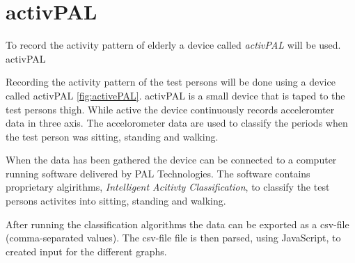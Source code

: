 \section{activPAL}
To record the activity pattern of elderly a device called \emph{activPAL} will be used. activPAL 


Recording the activity pattern of the test persons will be done using a device called activPAL \ref{fig:activePAL}. activPAL is a small device that is taped to the test persons thigh. While active the device continuously records acceleromter data in three axis. The accelorometer data are used to classify the periods when the test person was sitting, standing and walking.

When the data has been gathered the device can be connected to a computer running software delivered by PAL Technologies. The software contains proprietary algirithms, \emph{Intelligent Acitivty Classification}, to classify the test persons activites into sitting, standing and walking.


After running the classification algorithms the data can be exported as a csv-file (comma-separated values). The csv-file file is then parsed, using JavaScript, to created input for the different graphs.
